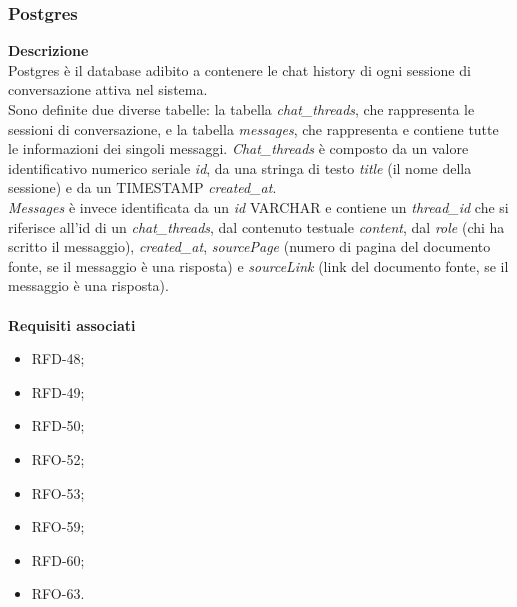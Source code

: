 \subsubsection{Postgres}
\textbf{Descrizione}\\
Postgres è il database adibito a contenere le chat history di ogni sessione di conversazione attiva nel sistema.\\
Sono definite due diverse tabelle: la tabella \textit{chat\_threads}, che rappresenta le sessioni di conversazione, e la tabella \textit{messages}, che rappresenta e contiene tutte le informazioni dei singoli messaggi.
\textit{Chat\_threads} è composto da un valore identificativo numerico seriale \textit{id}, da una stringa di testo \textit{title} (il nome della sessione) e da un TIMESTAMP \textit{created\_at}.\\
\textit{Messages} è invece identificata da un \textit{id} VARCHAR e contiene un \textit{thread\_id} che si riferisce all'id di un \textit{chat\_threads}, dal contenuto testuale \textit{content}, dal \textit{role} (chi ha scritto il messaggio), \textit{created\_at}, \textit{sourcePage} (numero di pagina del documento fonte, se il messaggio è una risposta) e \textit{sourceLink} (link del documento fonte, se il messaggio è una risposta).\\ \\
\textbf{Requisiti associati}
\begin{itemize}[itemsep=-4pt]
    \item RFD-48;
    \item RFD-49;
    \item RFD-50;
    \item RFO-52;
    \item RFO-53;
    \item RFO-59;
    \item RFD-60;
    \item RFO-63.
\end{itemize}


